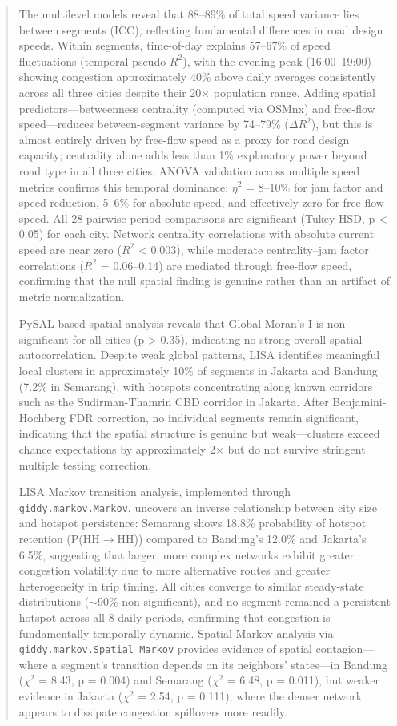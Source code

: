 \documentclass[11pt,a4paper]{article}
\begin{document}
\begin{abstract}
The multilevel models reveal that 88--89\% of total speed variance lies between segments (ICC), reflecting fundamental differences in road design speeds. Within segments, time-of-day explains 57--67\% of speed fluctuations (temporal pseudo-$R^2$), with the evening peak (16:00--19:00) showing congestion approximately 40\% above daily averages consistently across all three cities despite their 20$\times$ population range. Adding spatial predictors---betweenness centrality (computed via OSMnx) and free-flow speed---reduces between-segment variance by 74--79\% ($\Delta R^2$), but this is almost entirely driven by free-flow speed as a proxy for road design capacity; centrality alone adds less than 1\% explanatory power beyond road type in all three cities. ANOVA validation across multiple speed metrics confirms this temporal dominance: $\eta^2$ = 8--10\% for jam factor and speed reduction, 5--6\% for absolute speed, and effectively zero for free-flow speed. All 28 pairwise period comparisons are significant (Tukey HSD, p < 0.05) for each city. Network centrality correlations with absolute current speed are near zero ($R^2$ < 0.003), while moderate centrality--jam factor correlations ($R^2$ = 0.06--0.14) are mediated through free-flow speed, confirming that the null spatial finding is genuine rather than an artifact of metric normalization.

PySAL-based spatial analysis reveals that Global Moran's I is non-significant for all cities (p > 0.35), indicating no strong overall spatial autocorrelation. Despite weak global patterns, LISA identifies meaningful local clusters in approximately 10\% of segments in Jakarta and Bandung (7.2\% in Semarang), with hotspots concentrating along known corridors such as the Sudirman-Thamrin CBD corridor in Jakarta. After Benjamini-Hochberg FDR correction, no individual segments remain significant, indicating that the spatial structure is genuine but weak---clusters exceed chance expectations by approximately 2$\times$ but do not survive stringent multiple testing correction.

LISA Markov transition analysis, implemented through \texttt{giddy.markov.Markov}, uncovers an inverse relationship between city size and hotspot persistence: Semarang shows 18.8\% probability of hotspot retention (P(HH$\rightarrow$HH)) compared to Bandung's 12.0\% and Jakarta's 6.5\%, suggesting that larger, more complex networks exhibit greater congestion volatility due to more alternative routes and greater heterogeneity in trip timing. All cities converge to similar steady-state distributions ($\sim$90\% non-significant), and no segment remained a persistent hotspot across all 8 daily periods, confirming that congestion is fundamentally temporally dynamic. Spatial Markov analysis via \texttt{giddy.markov.Spatial\_Markov} provides evidence of spatial contagion---where a segment's transition depends on its neighbors' states---in Bandung ($\chi^2$ = 8.43, p = 0.004) and Semarang ($\chi^2$ = 6.48, p = 0.011), but weaker evidence in Jakarta ($\chi^2$ = 2.54, p = 0.111), where the denser network appears to dissipate congestion spillovers more readily.


\end{abstract}
\end{document}
